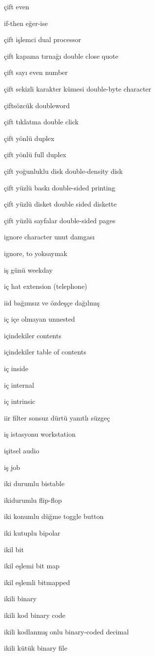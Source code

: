 \documentclass[12pt,fleqn]{article}\usepackage{../../common}
\begin{document}
çift even

if-then eğer-ise

çift işlemci dual processor

çift kapama tırnağı double close quote

çift sayı even number

çift sekizli karakter kümesi double-byte character

çiftsözcük doubleword

çift tıklatma double click

çift yönlü duplex

çift yönlü full duplex

çift yoğunluklu disk double-density disk

çift yüzlü baskı double-sided printing

çift yüzlü disket double sided diskette

çift yüzlü sayfalar double-sided pages

ignore character unut damgası

ignore, to yoksaymak

iş günü weekday

iç hat extension (telephone)

iid bağımsız ve özdeşçe dağılmış

iç içe olmayan unnested

içindekiler contents

içindekiler table of contents

iç inside

iç internal

iç intrinsic

iir filter sonsuz dürtü yanıtlı süzgeç

iş istasyonu workstation

işitsel audio

iş job

iki durumlu bistable

ikidurumlu flip-flop

iki konumlu düğme toggle button

iki kutuplu bipolar

ikil bit

ikil eşlemi bit map

ikil eşlemli bitmapped

ikili binary

ikili kod binary code

ikili kodlanmış onlu binary-coded decimal

ikili kütük binary file
\end{document}
